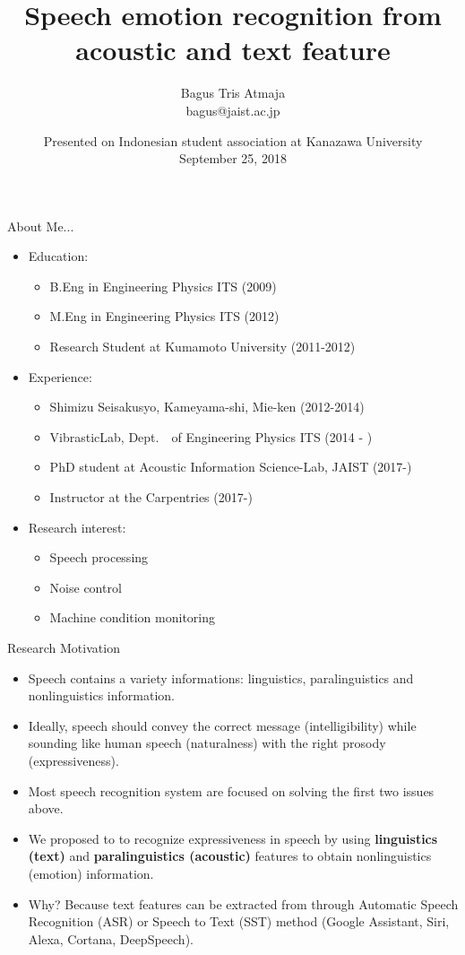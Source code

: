 \documentclass{beamer}
\author{Bagus Tris Atmaja \\ 
        bagus@jaist.ac.jp}
\title{\LARGE{Speech emotion recognition 
    \newline from acoustic and text feature }}
\institute{AIS-Lab \\ School of Information Science \\ JAIST}
\date{\tiny Presented on  Indonesian student association at Kanazawa University \\ September 25, 2018}
\begin{document}
\begin{frame}[t,plain]
\titlepage
\end{frame}

\begin{frame}[t, fragile]{About Me...}
\begin{itemize}
\item Education:
    \begin{itemize}
    \item B.Eng in Engineering Physics ITS (2009)
    \item M.Eng in Engineering Physics ITS (2012)
    \item Research Student at Kumamoto University (2011-2012)
    \end{itemize}
\item Experience:
    \begin{itemize}
    \item Shimizu Seisakusyo, Kameyama-shi, Mie-ken (2012-2014)
    \item VibrasticLab, Dept.　of Engineering Physics ITS (2014 - )
    \item PhD student at Acoustic Information Science-Lab, JAIST (2017-)
    \item Instructor at the Carpentries (2017-)
    \end{itemize}
\item Research interest:
    \begin{itemize}
    \item Speech processing
    \item Noise control
    \item Machine condition monitoring
    \end{itemize}
\end{itemize}
\end{frame}

\begin{frame}[t]{Research Motivation}
\begin{itemize}
  \item Speech contains a variety informations: linguistics, paralinguistics and
  		nonlinguistics information.
  \item Ideally, speech should convey the correct message (intelligibility) 
  while sounding like human speech (naturalness) with the right prosody (expressiveness).
  \item Most speech recognition system are focused on solving the first two 
  		issues above.
  \item We proposed to to recognize expressiveness in speech by using \textbf{linguistics (text)} 
  		and \textbf{paralinguistics (acoustic)} features to obtain nonlinguistics (emotion) information. 
  \item Why? Because text features can be extracted from through Automatic Speech Recognition
        (ASR) or Speech to Text (SST) method (Google Assistant, Siri, Alexa, Cortana, DeepSpeech).
  \end{itemize}
\end{frame}
\end{document}
